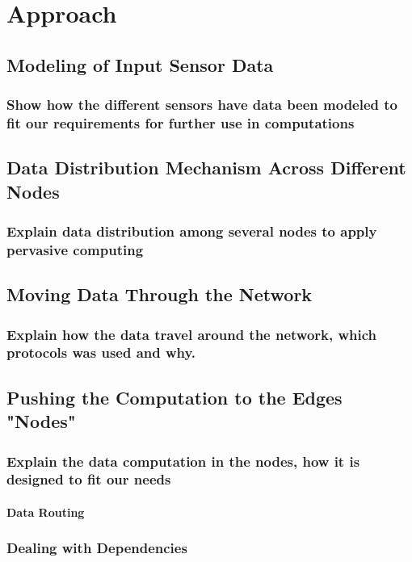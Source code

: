 
\chapter{Approach}\label{chapter:Approach}

\section{Modeling of Input Sensor Data}

\subsection{Show how the different sensors have data been modeled to fit our requirements for further use in computations}
\section{Data Distribution Mechanism Across Different Nodes}
\subsection{Explain data distribution among several nodes to apply pervasive computing}
\section{Moving Data Through the Network}
\subsection{Explain how the data travel around the network, which protocols was used and why.}
\section{Pushing the Computation to the Edges "Nodes"}
\subsection{Explain the data computation in the nodes, how it is designed to fit our needs}
\subsubsection{Data Routing}
\subsection{Dealing with Dependencies}
